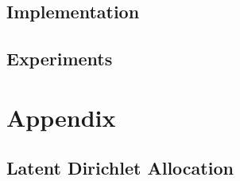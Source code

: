\documentclass{article}
\begin{document}
\subsection{Implementation} 
\subsection{Experiments} 







\section{Appendix} 
\subsection{Latent Dirichlet Allocation}
\end{document}
